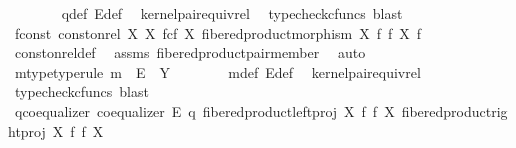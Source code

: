 \begin{isabellebody}
\ \ \ \ \ \ \isamarkupfalse%
\ q{\isacharunderscore}{\kern0pt}def\ E{\isacharunderscore}{\kern0pt}def\ \isamarkupfalse%
\ kernel{\isacharunderscore}{\kern0pt}pair{\isacharunderscore}{\kern0pt}equiv{\isacharunderscore}{\kern0pt}rel\ \isamarkupfalse%
\ {\isacharparenleft}{\kern0pt}typecheck{\isacharunderscore}{\kern0pt}cfuncs{\isacharcomma}{\kern0pt}\ blast{\isacharparenright}{\kern0pt}\isanewline
\ \ \ \ \isanewline
\ \ \ \ \isamarkupfalse%
\ f{\isacharunderscore}{\kern0pt}const{\isacharcolon}{\kern0pt}\ {\isachardoublequoteopen}const{\isacharunderscore}{\kern0pt}on{\isacharunderscore}{\kern0pt}rel\ X\ {\isacharparenleft}{\kern0pt}X\ \isactrlbsub f\isactrlesub {\isasymtimes}\isactrlsub c\isactrlbsub f\isactrlesub \ X{\isacharcomma}{\kern0pt}\ fibered{\isacharunderscore}{\kern0pt}product{\isacharunderscore}{\kern0pt}morphism\ X\ f\ f\ X{\isacharparenright}{\kern0pt}\ f{\isachardoublequoteclose}\isanewline
\ \ \ \ \ \ \isamarkupfalse%
\ const{\isacharunderscore}{\kern0pt}on{\isacharunderscore}{\kern0pt}rel{\isacharunderscore}{\kern0pt}def\ \isamarkupfalse%
\ assms\ fibered{\isacharunderscore}{\kern0pt}product{\isacharunderscore}{\kern0pt}pair{\isacharunderscore}{\kern0pt}member\ \isamarkupfalse%
\ auto\isanewline
\ \ \ \ \isamarkupfalse%
\ \isamarkupfalse%
\ m{\isacharunderscore}{\kern0pt}type{\isacharbrackleft}{\kern0pt}type{\isacharunderscore}{\kern0pt}rule{\isacharbrackright}{\kern0pt}{\isacharcolon}{\kern0pt}\ {\isachardoublequoteopen}m\ {\isacharcolon}{\kern0pt}\ E\ {\isasymrightarrow}\ Y{\isachardoublequoteclose}\isanewline
\ \ \ \ \ \ \isamarkupfalse%
\ m{\isacharunderscore}{\kern0pt}def\ E{\isacharunderscore}{\kern0pt}def\ \isamarkupfalse%
\ kernel{\isacharunderscore}{\kern0pt}pair{\isacharunderscore}{\kern0pt}equiv{\isacharunderscore}{\kern0pt}rel\ \isamarkupfalse%
\ {\isacharparenleft}{\kern0pt}typecheck{\isacharunderscore}{\kern0pt}cfuncs{\isacharcomma}{\kern0pt}\ blast{\isacharparenright}{\kern0pt}\isanewline
\ \ \ \ \isanewline
\ \ \ \ \isamarkupfalse%
\ q{\isacharunderscore}{\kern0pt}coequalizer{\isacharcolon}{\kern0pt}\ {\isachardoublequoteopen}coequalizer\ E\ q\ {\isacharparenleft}{\kern0pt}fibered{\isacharunderscore}{\kern0pt}product{\isacharunderscore}{\kern0pt}left{\isacharunderscore}{\kern0pt}proj\ X\ f\ f\ X{\isacharparenright}{\kern0pt}\ {\isacharparenleft}{\kern0pt}fibered{\isacharunderscore}{\kern0pt}product{\isacharunderscore}{\kern0pt}right{\isacharunderscore}{\kern0pt}proj\ X\ f\ f\ X{\isacharparenright}{\kern0pt}{\isachardoublequoteclose}\isanewline

\end{isabellebody}
